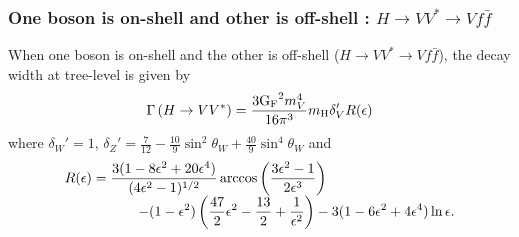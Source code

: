 \subsubsection{One boson is on-shell and other is off-shell : 
               $H \rightarrow VV^* \rightarrow Vf\bar{f}$}
When one boson is on-shell and the other is off-shell
($ H \rightarrow VV^* \rightarrow Vf\bar{f}$), %
the decay width at tree-level is given by~\cite{PhysRevD.49.79}
\begin{eqnarray} 
\Gamma \left( H \rightarrow VV^* \right) 
=
\frac{3\mathrm{G_{\mathrm{F}}}^2 m_V^4}{16\pi^3} m_{\mathrm{H}} \delta_V' R(\epsilon)
\end{eqnarray} 
where $\delta_W'=1$, $\displaystyle \delta_Z'=\frac{7}{12}-\frac{10}{9}\sin^2\theta_W 
+ \frac{40}{9}\sin^4\theta_W$ and 
\begin{eqnarray}   
\begin{array}{ccc} \multicolumn{2}{c}{\displaystyle 
R(\epsilon) = \frac{3(1-8\epsilon^2+20\epsilon^4)}{(4\epsilon^2-1)^{1/2}} 
                \arccos \left( \frac{3\epsilon^2-1}{2\epsilon^3} \right)  
} & \\ & \multicolumn{2}{c}{\hspace{1.5cm} \displaystyle
- (1-\epsilon^2)\left( \frac{47}{2}\epsilon^2 - \frac{13}{2} + \frac{1}{\epsilon^2} \right)  
- 3(1-6\epsilon^2+4\epsilon^4) \ln \epsilon.
} \end{array}      
\end{eqnarray} 

